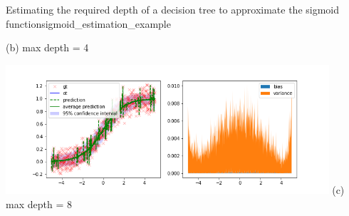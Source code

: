 \begin{Bsp}{Estimating the required depth of a decision tree to approximate the sigmoid function}{sigmoid_estimation_example}
\begin{minipage}[t]{\linewidth}
\begin{minipage}{\linewidth}
        (b) max depth = 4
    \end{minipage}
    \vspace{0.3cm}
    \begin{minipage}{\linewidth}
        \centering
    \includegraphics[width=12cm]{images/ml_basics/depth_8.png}\newline
        (c) max depth = 8
    \end{minipage}
    \label{fig:example_bias_vs_variance_per_depth}
    \vspace{1ex}
\end{minipage}
\end{Bsp}



